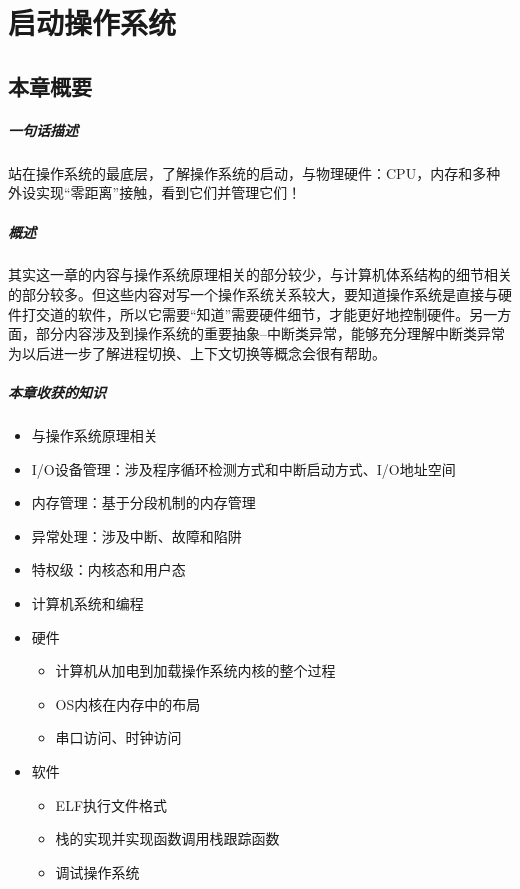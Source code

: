 \chapter{启动操作系统}\label{ch_boot}

\section{本章概要}

\paragraph{一句话描述}
站在操作系统的最底层，了解操作系统的启动，与物理硬件：CPU，内存和多种外设实现“零距离”接触，看到它们并管理它们！

\paragraph{概述}

其实这一章的内容与操作系统原理相关的部分较少，与计算机体系结构的细节相关的部分较多。但这些内容对写一个操作系统关系较大，要知道操作系统是直接与硬件打交道的软件，所以它需要``知道''需要硬件细节，才能更好地控制硬件。另一方面，部分内容涉及到操作系统的重要抽象--中断类异常，能够充分理解中断类异常为以后进一步了解进程切换、上下文切换等概念会很有帮助。

\paragraph{本章收获的知识}

\begin{itemize}
	\item
	与操作系统原理相关
	\item
	I/O设备管理：涉及程序循环检测方式和中断启动方式、I/O地址空间
	\item
	内存管理：基于分段机制的内存管理
	\item
	异常处理：涉及中断、故障和陷阱
	\item
	特权级：内核态和用户态
	\item
	计算机系统和编程
	\item
	硬件	
	\begin{itemize}
		\item
		计算机从加电到加载操作系统内核的整个过程
		\item
		OS内核在内存中的布局
		\item
		串口访问、时钟访问
	\end{itemize}
	\item
	软件	
	\begin{itemize}
		\item
		ELF执行文件格式
		\item
		栈的实现并实现函数调用栈跟踪函数
		\item
		调试操作系统
	\end{itemize}
\end{itemize}

